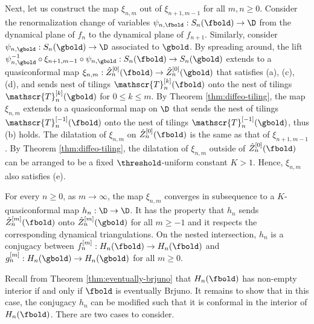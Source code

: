 \documentclass{amsart}
\begin{document}
    Next, let us construct the map $\xi_{n,m}$ out of $\xi_{n+1,m-1}$ for all $m,n \geq 0$.
    Consider the renormalization change of variables $\psi_{n,\fbold}: S_{n}(\fbold) \to \D$ from the dynamical plane of $f_n$ to the dynamical plane of $f_{n+1}$.
    Similarly, consider $\psi_{n,\gbold}: S_{n}(\gbold) \to \D$ associated to $\gbold$.
    By spreading around, the lift $\psi_{n,\gbold}^{-1} \circ \xi_{n+1,m-1} \circ \psi_{n,\gbold} : S_{n}(\fbold) \to S_{n}(\gbold)$ extends to a quasiconformal map $\xi_{n,m}: \hat{Z}_n^{[0]}(\fbold) \to \hat{Z}_n^{[0]}(\gbold)$ that satisfies (a), (c), (d), and sends nest of tilings $\mathscr{T}_n^{[k]}(\fbold)$ onto the nest of tilings $\mathscr{T}_n^{[k]}(\gbold)$ for $0 \leq k \leq m$.
    By Theorem \ref{thm:diffeo-tiling}, the map $\xi_{n,m}$ extends to a quasiconformal map on $\D$ that sends the nest of tilings $\mathscr{T}_n^{[-1]}(\fbold)$ onto the nest of tilings $\mathscr{T}_n^{[-1]}(\gbold)$, thus (b) holds.
    The dilatation of $\xi_{n,m}$ on $\hat{Z}_n^{[0]}(\fbold)$ is the same as that of $\xi_{n+1,m-1}$. By Theorem \ref{thm:diffeo-tiling}, the dilatation of $\xi_{n,m}$ outside of $\hat{Z}_n^{[0]}(\fbold)$ can be arranged to be a fixed $\threshold$-uniform constant $K>1$.
    Hence, $\xi_{n,m}$ also satisfies (e).

    For every $n \geq 0$, as $m \to \infty$, the map $\xi_{n,m}$ converges in subsequence to a $K$-quasiconformal map $h_n: \D \to \D$. It has the property that $h_n$ sends $\hat{Z}^{[m]}_n(\fbold)$ onto $\hat{Z}^{[m]}_n(\gbold)$ for all $m \geq -1$ and it respects the corresponding dynamical triangulations. On the nested intersection, $h_n$ is a conjugacy between $f_n^{[m]}: H_n(\fbold) \to H_n(\fbold)$ and $g_n^{[m]}: H_n(\gbold) \to H_n(\gbold)$ for all $m \geq 0$.
    
    Recall from Theorem \ref{thm:eventually-brjuno} that $H_n(\fbold)$ has non-empty interior if and only if $\fbold$ is eventually Brjuno.
    It remains to show that in this case, the conjugacy $h_n$ can be modified such that it is conformal in the interior of $H_n(\fbold)$.
    There are two cases to consider.
    \vspace{0.1in}
    
\end{document}
